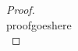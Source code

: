 \documentclass[12pt]{article}
\begin{document}













\begin{proof}
\leavevmode\\
    proofgoeshere \\
\end{proof}
\pagebreak
\end{document}
